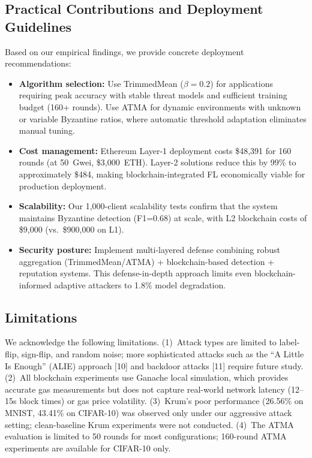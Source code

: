 \documentclass[12pt,a4paper,onecolumn]{article}
\begin{document}
\subsection{Practical Contributions and Deployment Guidelines}

Based on our empirical findings, we provide concrete deployment recommendations:

\begin{itemize}
    \item \textbf{Algorithm selection:} Use TrimmedMean ($\beta=0.2$) for applications requiring peak accuracy with stable threat models and sufficient training budget (160+ rounds). Use ATMA for dynamic environments with unknown or variable Byzantine ratios, where automatic threshold adaptation eliminates manual tuning.
    
    \item \textbf{Cost management:} Ethereum Layer-1 deployment costs \$48,391 for 160 rounds (at 50~Gwei, \$3,000~ETH). Layer-2 solutions reduce this by 99\% to approximately \$484, making blockchain-integrated FL economically viable for production deployment.
    
    \item \textbf{Scalability:} Our 1,000-client scalability tests confirm that the system maintains Byzantine detection (F1=0.68) at scale, with L2 blockchain costs of \$9,000 (vs.~\$900,000 on L1).
    
    \item \textbf{Security posture:} Implement multi-layered defense combining robust aggregation (TrimmedMean/ATMA) + blockchain-based detection + reputation systems. This defense-in-depth approach limits even blockchain-informed adaptive attackers to 1.8\% model degradation.
\end{itemize}

\subsection{Limitations}

We acknowledge the following limitations. (1)~Attack types are limited to label-flip, sign-flip, and random noise; more sophisticated attacks such as the ``A Little Is Enough'' (ALIE) approach [10] and backdoor attacks [11] require future study. (2)~All blockchain experiments use Ganache local simulation, which provides accurate gas measurements but does not capture real-world network latency (12--15s block times) or gas price volatility. (3)~Krum's poor performance (26.56\% on MNIST, 43.41\% on CIFAR-10) was observed only under our aggressive attack setting; clean-baseline Krum experiments were not conducted. (4)~The ATMA evaluation is limited to 50 rounds for most configurations; 160-round ATMA experiments are available for CIFAR-10 only.
\end{document}

